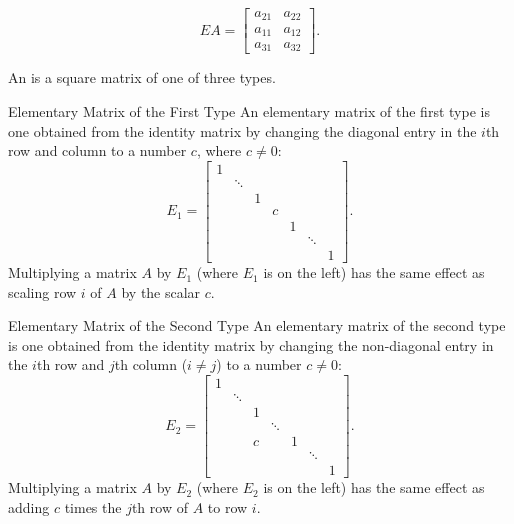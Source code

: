 \[EA = \left[ \begin{array}{cc} a_{21} & a_{22}  \\
a_{11} & a_{12}  \\ 
a_{31} & a_{32}  
 \end{array} \right].\]





\edXsolution{

}

\endedxproblem

\endedxvertical





{}  An {} is a square matrix of one of three types.  


\begin{edXshowhide}{Elementary Matrix of the First Type}
An elementary matrix of the first type is one obtained from the identity matrix by changing the diagonal entry in the 
$i$th row and column to a number 
$c$, where $c \ne 0$:  
\[ E_1 = \left[ 
\begin{array}{ccccccc}
1 &  &  &  &  &  &  \\
 & \ddots &  &  &  &  &  \\
 &   & 1& &  &  &  \\
 &   &  &  c &  &  &  \\
 &   &  &  & 1 &  &  \\
 &   &  &  &  & \ddots  &  \\
 &   &  &  &  &   & 1 
\end{array}
\right].  \]
Multiplying  a matrix $A$ by $E_1$ (where $E_1$ is on the left) has the same effect as scaling row $i$ of $A$ by the scalar $c$.  
\end{edXshowhide}

\begin{edXshowhide}{Elementary Matrix of the Second Type}
An elementary matrix of the second type is one obtained from the identity matrix by changing the non-diagonal entry in the $i$th row and $j$th column ($i\ne j$) to a number $c \ne 0$: 
\[ E_2 = \left[ 
\begin{array}{ccccccc}
1 &  &  &  &  &  &  \\
 & \ddots &  &  &  &  &  \\
 &   & 1& &  &  &  \\
 &   &  &  \ddots &  &  &  \\
 &   &  c &  & 1 &  &  \\
 &   &  &  &  & \ddots  &  \\
 &   &  &  &  &   & 1 
\end{array}
\right].  \]
Multiplying  a matrix $A$ by $E_2$ (where $E_2$ is on the left) has the same effect as adding $c$ times the $j$th row of $A$ to row $i$.  
\end{edXshowhide}

